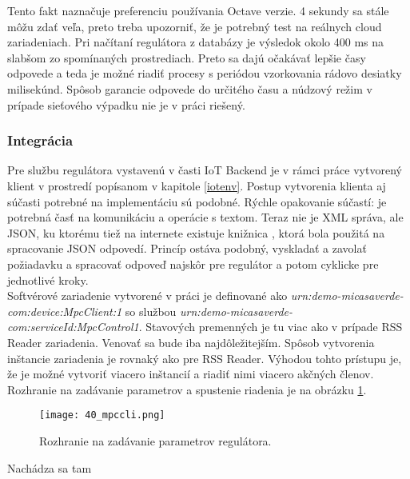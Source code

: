 Tento fakt naznačuje preferenciu používania Octave verzie. 4 sekundy sa stále môžu zdať veľa, preto treba upozorniť, že je potrebný test na reálnych cloud zariadeniach. Pri  načítaní regulátora z databázy je výsledok okolo 400 ms na slabšom zo spomínaných prostrediach. Preto sa dajú očakávať lepšie časy odpovede a teda je možné riadiť procesy s periódou vzorkovania rádovo desiatky milisekúnd. Spôsob garancie odpovede do určitého času a núdzový režim v prípade sieťového výpadku nie je v práci riešený.
\subsubsection{Integrácia}
Pre službu regulátora vystavenú v časti IoT Backend je v rámci práce vytvorený klient v prostredí popísanom v kapitole \ref{iotenv}. Postup vytvorenia klienta aj súčasti potrebné na implementáciu sú podobné. Rýchle opakovanie súčastí: je potrebná časť na komunikáciu a operácie s textom. Teraz nie je XML správa, ale JSON, ku ktorému tiež na internete existuje knižnica \cite{IOT30}, ktorá bola použitá na spracovanie JSON odpovedí. Princíp ostáva podobný, vyskladať a zavolať požiadavku a spracovať odpoveď najskôr pre regulátor a potom cyklicke pre jednotlivé kroky.\\
\indent Softvérové zariadenie vytvorené v práci je definované ako \textit{urn:demo-micasaverde-com:device:MpcClient:1} so službou \textit{urn:demo-micasaverde-com:serviceId:MpcControl1}. Stavových premenných je tu viac ako v prípade RSS Reader zariadenia. Venovať sa bude iba najdôležitejším. Spôsob vytvorenia inštancie zariadenia je rovnaký ako pre RSS Reader. Výhodou tohto prístupu je, že je možné vytvoriť viacero inštancií a riadiť nimi viacero akčných členov. Rozhranie na zadávanie parametrov a spustenie riadenia je na obrázku  \ref{40_mpccli}.
\begin{figure}[h]
\centering
\texttt{[image: 40\_mpccli.png]}
\caption{Rozhranie na zadávanie parametrov regulátora.}
\label{40_mpccli}
\end{figure} 
Nachádza sa tam
